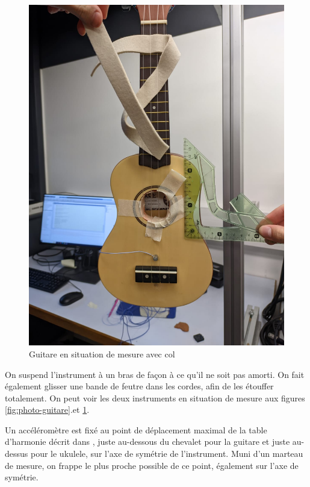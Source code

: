 \documentclass[atiam, article]{rapport} %
\begin{document}
\begin{figure}
  \begin{center}
    \includegraphics[width=\textwidth/4]{cordes/ukulele.jpg}
  \end{center}
  \caption{Guitare en situation de mesure avec col}
  \label{fig:photo-ukulele}
\end{figure}

On suspend l'instrument à un bras de façon à ce qu'il ne soit pas amorti. On fait également glisser une bande de feutre dans les cordes, afin de les étouffer totalement. On peut voir les deux instruments en situation de mesure aux figures \ref{fig:photo-guitare}.et \ref{fig:photo-ukulele}.

Un accéléromètre est fixé au point de déplacement maximal de la table d'harmonie décrit dans \cite{fletcher2012physics}, juste au-dessous du chevalet pour la guitare et juste au-dessus pour le ukulele, sur l'axe de symétrie de l'instrument. Muni d'un marteau de mesure, on frappe le plus proche possible de ce point, également sur l'axe de symétrie.
\end{document}
